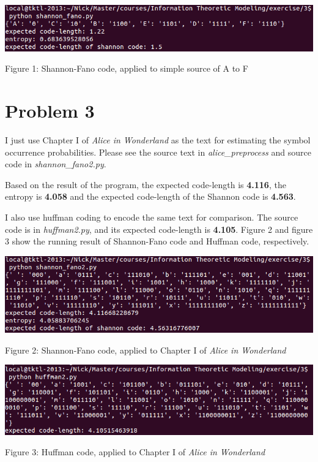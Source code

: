 \documentclass{article}
\begin{document}
\vspace{5mm}
\begin{minipage}{0.9\textwidth}
  \includegraphics[width=\textwidth,keepaspectratio]{1.png}
  \centerline{Figure 1: Shannon-Fano code, applied to simple source of A to F}
\end{minipage}

\section{Problem 3}

I just use Chapter I of \emph{Alice in Wonderland} as the text for estimating the symbol occurrence probabilities. Please see the source text in \emph{alice\_preprocess} and source code in \emph{shannon\_fano2.py}. 

Based on the result of the program, the expected code-length is \textbf{4.116}, the entropy is \textbf{4.058} and the expected code-length of the Shannon code is \textbf{4.563}.

I also use huffman coding to encode the same text for comparison. The source code is in \emph{huffman2.py}, and its expected code-length is \textbf{4.105}. Figure 2 and figure 3 show the running result of Shannon-Fano code and Huffman code, respectively.

\vspace{5mm}
\begin{minipage}{0.9\textwidth}
  \includegraphics[width=\textwidth,keepaspectratio]{2.png}
  \centerline{Figure 2: Shannon-Fano code, applied to Chapter I of \emph{Alice in Wonderland}}
\end{minipage}

\vspace{5mm}
\begin{minipage}{0.9\textwidth}
  \includegraphics[width=\textwidth,keepaspectratio]{3.png}
  \centerline{Figure 3: Huffman code, applied to Chapter I of \emph{Alice in Wonderland}}
\end{minipage}
\end{document}
